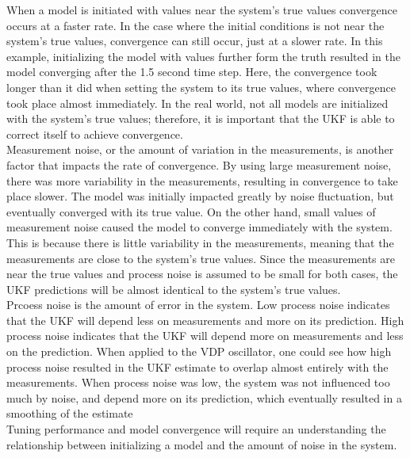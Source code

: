 \noindent When a model is initiated with values near the system's true values convergence occurs at a faster rate. In the case where the initial conditions is not near the system's true values, convergence can still occur, just at a slower rate. In this example, initializing the model with values further form the truth resulted in the model converging after the 1.5 second time step. Here, the convergence took longer than it did when setting the system to its true values, where convergence took place almost immediately. In the real world, not all models are initialized with the system's true values; therefore, it is important that the UKF is able to correct itself to achieve convergence. \\
   
\noindent Measurement noise, or the amount of variation in the measurements, is another factor that impacts the rate of convergence. By using large measurement noise, there was more variability in the measurements, resulting in convergence to take place slower. The model was initially impacted greatly by noise fluctuation, but eventually converged with its true value. On the other hand, small values of measurement noise caused the model to converge immediately with the system. This is because there is little variability in the measurements, meaning that the measurements are close to the system's true values. Since the measurements are near the true values and process noise is assumed to be small for both cases, the UKF predictions will be almost identical to the system's true values.\\

\noindent Prcoess noise is the amount of error in the system. Low process noise indicates that the UKF will depend less on measurements and more on its prediction. High process noise indicates that the UKF will depend more on measurements and less on the prediction. When applied to the VDP oscillator, one could see how high process noise resulted in the UKF estimate to overlap almost entirely with the measurements. When process noise was low, the system was not influenced too much by noise, and depend more on its prediction, which eventually resulted in a smoothing of the estimate \\

\noindent Tuning performance and model convergence will require an understanding the relationship between initializing a model and the amount of noise in the system. 
   
   
   
   
   
   
    
